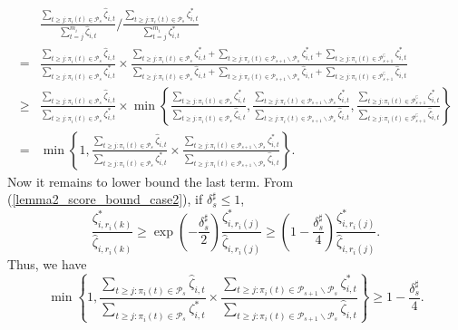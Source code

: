 \documentclass[
  12pt]{article}
\begin{document}
$$\begin{aligned}
& \frac{\sum_{t \geq j: \pi_i(t) \in \mathcal{P}_{s}} \widehat{\zeta}_{i,t}}{\sum_{t=j}^{m_i} \widehat{\zeta}_{i,t}} \bigg/ \frac{\sum_{t \geq j: \pi_i(t) \in \mathcal{P}_{s}} \zeta^*_{i,t}}{\sum_{t=j}^{m_i} \zeta^*_{i,t}}\\
= & \frac{\sum_{t \geq j: \pi_i(t) \in \mathcal{P}_{s}} \widehat{\zeta}_{i,t}}{\sum_{t \geq j: \pi_i(t) \in \mathcal{P}_{s}} \zeta^*_{i,t}} \times \frac{\sum_{t \geq j: \pi_i(t) \in \mathcal{P}_{s}} \zeta^*_{i,t}+\sum_{t \geq j: \pi_i(t) \in \mathcal{P}_{s+1} \backslash \mathcal{P}_{s}} \zeta^*_{i,t}+\sum_{t \geq j: \pi_i(t) \in\mathcal{P}_{s+1}^\complement} \zeta^*_{i,t}}{\sum_{t \geq j: \pi_i(t) \in \mathcal{P}_{s}} \widehat{\zeta}_{i,t}+\sum_{t \geq j: \pi_i(t) \in \mathcal{P}_{s+1} \backslash \mathcal{P}_{s}} \widehat{\zeta}_{i,t}+\sum_{t \geq j: \pi_i(t) \in\mathcal{P}_{s+1}^\complement} \widehat{\zeta}_{i,t}} \\
\geq & \frac{\sum_{t \geq j: \pi_i(t) \in \mathcal{P}_{s}} \widehat{\zeta}_{i,t}}{\sum_{t \geq j: \pi_i(t) \in \mathcal{P}_{s}} \zeta^*_{i,t}} \times \min \left\{\frac{\sum_{t \geq j: \pi_i(t) \in \mathcal{P}_{s}} \zeta^*_{i,t}}{\sum_{t \geq j: \pi_i(t) \in \mathcal{P}_{s}} \widehat{\zeta}_{i,t}}, \frac{\sum_{t \geq j: \pi_i(t) \in \mathcal{P}_{s+1} \backslash \mathcal{P}_{s}} \zeta^*_{i,t}}{\sum_{t \geq j: \pi_i(t) \in \mathcal{P}_{s+1} \backslash \mathcal{P}_{s}} \widehat{\zeta}_{i,t}}, \frac{\sum_{t \geq j: \pi_i(t) \in\mathcal{P}_{s+1}^\complement} \zeta^*_{i,t}}{\sum_{t \geq j: \pi_i(t) \in \mathcal{P}_{s+1}^\complement} \widehat{\zeta}_{i,t}}\right\} \\
= & \min \left\{1, \frac{\sum_{t \geq j: \pi_i(t) \in \mathcal{P}_{s}} \widehat{\zeta}_{i,t}}{\sum_{t \geq j: \pi_i(t) \in \mathcal{P}_{s}} \zeta^*_{i,t}} \times \frac{\sum_{t \geq j: \pi_i(t) \in \mathcal{P}_{s+1} \backslash \mathcal{P}_{s}} \zeta^*_{i,t}}{\sum_{t \geq j: \pi_i(t) \in \mathcal{P}_{s+1} \backslash \mathcal{P}_{s}} \widehat{\zeta}_{i,t}}\right\}.
\end{aligned}$$
\noindent Now it remains to lower bound the last term. From (\ref{lemma2_score_bound_case2}), if $\delta^\sharp_s \leq 1$,
$$\frac{\zeta^*_{i,r_i(k)}}{ \widehat{\zeta}_{i,r_i(k)}} \geq \exp \left(-\frac{\delta^\sharp_s}{2}\right) \frac{\zeta^*_{i,r_i(j)}}{ \widehat{\zeta}_{i,r_i(j)}} \geq\left(1-\frac{\delta^\sharp_s}{4}\right) \frac{\zeta^*_{i,r_i(j)}}{ \widehat{\zeta}_{i,r_i(j)}} .$$
\noindent Thus, we have
$$\min \left\{1, \frac{\sum_{t \geq j: \pi_i(t) \in \mathcal{P}_{s}} \widehat{\zeta}_{i,t}}{\sum_{t \geq j: \pi_i(t) \in \mathcal{P}_{s}} \zeta^*_{i,t}} \times \frac{\sum_{t \geq j: \pi_i(t) \in \mathcal{P}_{s+1} \backslash \mathcal{P}_{s}} \zeta^*_{i,t}}{\sum_{t \geq j: \pi_i(t) \in \mathcal{P}_{s+1} \backslash \mathcal{P}_{s}} \widehat{\zeta}_{i,t}}\right\}\geq 1-\frac{\delta^\sharp_s}{4} .$$
\end{document}
